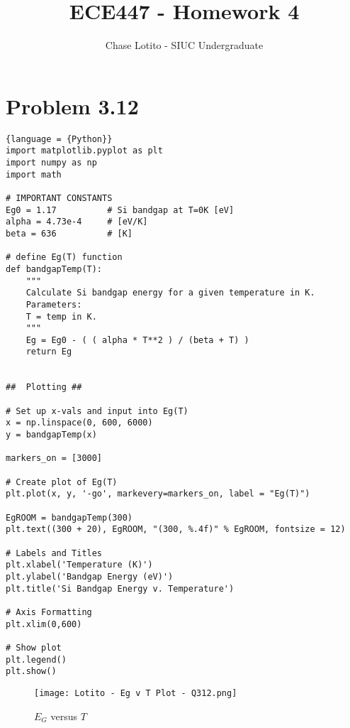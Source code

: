 \documentclass{article}
\title{ECE447 - Homework 4}
\author{Chase Lotito - SIUC Undergraduate}
\date{}
\begin{document}
\maketitle

\section{Problem 3.12}

\begin{lstlisting}{language = {Python}}
import matplotlib.pyplot as plt
import numpy as np
import math

# IMPORTANT CONSTANTS
Eg0 = 1.17          # Si bandgap at T=0K [eV]
alpha = 4.73e-4     # [eV/K]
beta = 636          # [K]

# define Eg(T) function
def bandgapTemp(T):
    """
    Calculate Si bandgap energy for a given temperature in K.
    Parameters:
    T = temp in K.
    """
    Eg = Eg0 - ( ( alpha * T**2 ) / (beta + T) )
    return Eg


##  Plotting ##

# Set up x-vals and input into Eg(T)
x = np.linspace(0, 600, 6000)
y = bandgapTemp(x)

markers_on = [3000]

# Create plot of Eg(T)
plt.plot(x, y, '-go', markevery=markers_on, label = "Eg(T)")

EgROOM = bandgapTemp(300)
plt.text((300 + 20), EgROOM, "(300, %.4f)" % EgROOM, fontsize = 12)

# Labels and Titles
plt.xlabel('Temperature (K)')
plt.ylabel('Bandgap Energy (eV)')
plt.title('Si Bandgap Energy v. Temperature')

# Axis Formatting
plt.xlim(0,600)

# Show plot
plt.legend()
plt.show()
\end{lstlisting}

\begin{figure}[!h] 
    \centering
    \texttt{[image: Lotito - Eg v T Plot - Q312.png]}
    \caption{\(E_G\) versus \(T\)}
    \label{fig:bandgapTemp}
\end{figure}
\end{document}
